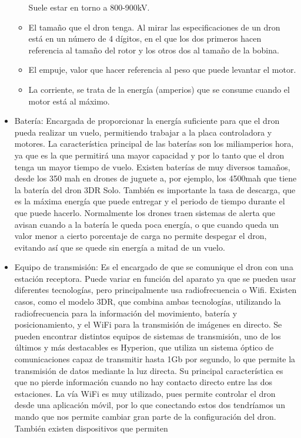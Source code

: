 \begin{itemize}
\begin{itemize}
Suele estar en torno a 800-900kV.
	\item El tamaño que el dron tenga. Al mirar las especificaciones de un dron está en
un número de 4 dígitos, en el que los dos primeros hacen referencia al tamaño
del rotor y los otros dos al tamaño de la bobina.
	\item El empuje, valor que hacer referencia al peso que puede levantar el motor.
	\item La corriente, se trata de la energía (amperios) que se consume cuando el motor
está al máximo.
	\end{itemize}
\item Batería: Encargada de proporcionar la energía suficiente para que el dron
pueda realizar un vuelo, permitiendo trabajar a la placa controladora y motores. La
característica principal de las baterías son los miliamperios hora, ya que es la que
permitirá una mayor capacidad y por lo tanto que el dron tenga un mayor tiempo
de vuelo. Existen baterías de muy diversos tamaños, desde los 350 mah en drones de
juguete a, por ejemplo, los 4500mah que tiene la batería del dron 3DR Solo. También
es importante la tasa de descarga, que es la máxima energía que puede entregar y el
periodo de tiempo durante el que puede hacerlo. Normalmente los drones traen sistemas
de alerta que avisan cuando a la batería le queda poca energía, o que cuando queda
un valor menor a cierto porcentaje de carga no permite despegar el dron, evitando así
que se quede sin energía a mitad de un vuelo.
\item Equipo de transmisión: Es el encargado de que se comunique el dron con
una estación receptora. Puede variar en función del aparato ya que se pueden usar
diferentes tecnologías, pero principalmente usa radiofrecuencia o Wifi. Existen casos,
como el modelo 3DR, que combina ambas tecnologías, utilizando la radiofrecuencia
para la información del movimiento, batería y posicionamiento, y el WiFi para la
transmisión de imágenes en directo. Se pueden encontrar distintos equipos de sistemas
de transmisión, uno de los últimos y más destacables es Hyperion, que utiliza un
sistema óptico de comunicaciones capaz de transmitir hasta 1Gb por segundo, lo que
permite la transmisión de datos mediante la luz directa. Su principal característica
es que no pierde información cuando no hay contacto directo entre las dos estaciones.
La vía WiFi es muy utilizado, pues permite controlar el dron desde una aplicación
móvil, por lo que conectando estos dos tendríamos un mando que nos permite cambiar
gran parte de la configuración del dron. También existen dispositivos que permiten

\end{itemize}
